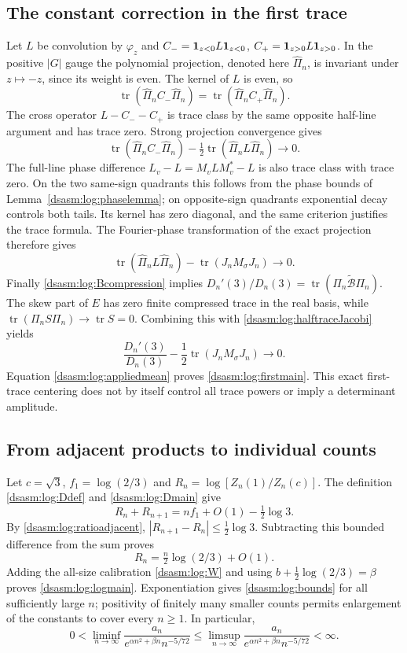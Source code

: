 \documentclass[11pt,letterpaper]{article}
\theoremstyle{remark}\newtheorem{remark}[theorem]{Remark}
\DeclareMathOperator{\tr}{tr}\DeclareMathOperator{\Ran}{Ran}
\begin{document}
\subsection{The constant correction in the first trace}
Let $L$ be convolution by $\varphi_z$ and
$C_-=\mathbf1_{z<0}L\mathbf1_{z<0}$, $C_+=\mathbf1_{z>0}L\mathbf1_{z>0}$.
In the positive $|G|$ gauge the polynomial projection, denoted here
$\widehat\Pi_n$, is invariant under $z\mapsto-z$, since its weight
is even. The kernel of $L$ is even, so
\[
 \tr(\widehat\Pi_nC_-\widehat\Pi_n)
 =\tr(\widehat\Pi_nC_+\widehat\Pi_n).
\]
The cross operator $L-C_--C_+$ is trace class by the same opposite
half-line argument and has trace zero. Strong projection convergence
gives
\begin{equation}\label{dsasm:log:halftraceJacobi}
 \tr(\widehat\Pi_nC_-\widehat\Pi_n)
          -\tfrac12\tr(\widehat\Pi_nL\widehat\Pi_n)\longrightarrow0.
\end{equation}
The full-line phase difference $L_v-L=M_vLM_v^*-L$ is also trace
class with trace zero. On the two same-sign quadrants this follows
from the phase bounds of Lemma~\ref{dsasm:log:phaselemma}; on opposite-sign
quadrants exponential decay controls both tails. Its kernel has
zero diagonal, and the same criterion justifies the trace formula.
The Fourier-phase transformation of the exact projection therefore
gives
\[
 \tr(\widehat\Pi_nL\widehat\Pi_n)
             -\tr(J_nM_\sigma J_n)\longrightarrow0.
\]
Finally \eqref{dsasm:log:Bcompression} implies
$D_n'(3)/D_n(3)=\tr(\Pi_n\widetilde{\mathcal B}\Pi_n)$.
The skew part of $E$ has zero finite compressed trace in the real
basis, while $\tr(\Pi_n S\Pi_n)\to\tr S=0$. Combining this with
\eqref{dsasm:log:halftraceJacobi} yields
\[
 \frac{D_n'(3)}{D_n(3)}-\frac12\tr(J_nM_\sigma J_n)\longrightarrow0.
\]
Equation \eqref{dsasm:log:appliedmean} proves \eqref{dsasm:log:firstmain}. This exact
first-trace centering does not by itself control all trace powers
or imply a determinant amplitude.

\subsection{From adjacent products to individual counts}
Let $c=\sqrt3$, $f_1=\log(2/3)$ and
$R_n=\log[Z_n(1)/Z_n(c)]$. The definition \eqref{dsasm:log:Ddef} and
\eqref{dsasm:log:Dmain} give
\[
 R_n+R_{n+1}=nf_1+O(1)-\tfrac12\log3.
\]
By \eqref{dsasm:log:ratioadjacent}, $|R_{n+1}-R_n|\le\tfrac12\log3$.
Subtracting this bounded difference from the sum proves
\[
 R_n=\tfrac n2\log(2/3)+O(1).
\]
Adding the all-size calibration \eqref{dsasm:log:W} and using
$b+\tfrac12\log(2/3)=\beta$ proves \eqref{dsasm:log:logmain}. Exponentiation
gives \eqref{dsasm:log:bounds} for all sufficiently large $n$; positivity of
finitely many smaller counts permits enlargement of the constants
to cover every $n\ge1$. In particular,
\[
 0<\liminf_{n\to\infty}\frac{a_n}{e^{\alpha n^2+\beta n}n^{-5/72}}
 \le\limsup_{n\to\infty}\frac{a_n}{e^{\alpha n^2+\beta n}n^{-5/72}}
 <\infty.
\]
\end{document}
